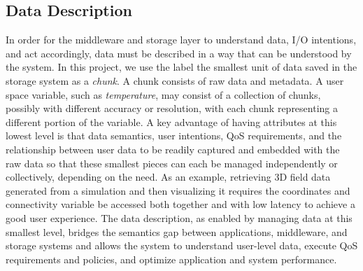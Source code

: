 \subsection{Data Description}
In order for the middleware and storage layer to understand data, I/O
intentions, and act accordingly, data must be described in a way that can be
understood by the system. In this project, we use the label the smallest unit of data
saved in the storage system as a \textit{chunk}.  A chunk consists of raw
data and metadata.  A user space variable, such as \textit{temperature}, may
consist of a collection of chunks, possibly with different accuracy or
resolution, with each chunk representing a different portion of the variable.
A key advantage of having attributes at this lowest level is that data
semantics, user intentions, QoS requirements, and the relationship between user
data to be readily captured and embedded with the raw data so that these
smallest pieces can each be managed independently or collectively, depending on
the need. As an example, retrieving 3D field data generated from a simulation
and then visualizing it requires the coordinates and connectivity variable be
accessed both together and with low latency to achieve a good user experience.
The data description, as enabled by managing data at this smallest level,
bridges the semantics gap between applications, middleware, and storage
systems and allows the system to understand user-level data, execute QoS
requirements and policies, and optimize application and system performance.


